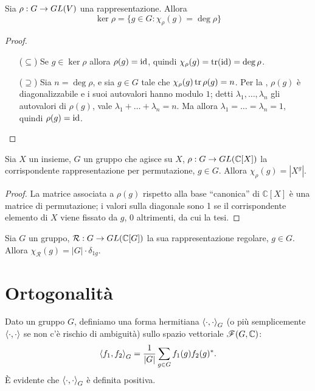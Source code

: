 \begin{proposition}
Sia $\rho:G\to GL(V)$ una rappresentazione. Allora
$$
\ker\rho=\{g\in G:\chi_\rho(g)=\deg\rho\}
$$
\end{proposition}
\begin{proof}
\leavevmode
\begin{itemize}
\item[($\subseteq$)] Se $g\in\ker\rho$ allora $\rho(g)=\operatorname{id}$, quindi $\chi_\rho(g)=\operatorname{tr}(\operatorname{id})=\deg\rho$.
\item[($\supseteq$)] Sia $n=\deg\rho$, e sia $g\in G$ tale che $\chi_\rho(g)\operatorname{tr}\rho(g)=n$. Per la , $\rho(g)$ è diagonalizzabile e i suoi autovalori hanno modulo $1$; detti $\lambda_1,\ldots,\lambda_n$ gli autovalori di $\rho(g)$, vale $\lambda_1+\ldots+\lambda_n=n$. Ma allora $\lambda_1=\ldots=\lambda_n=1$, quindi $\rho(g)=\operatorname{id}$.
\end{itemize}
\end{proof}


\begin{proposition}
Sia $X$ un insieme, $G$ un gruppo che agisce su $X$, $\rho:G\to GL(\mathbb{C}[X])$ la corrispondente rappresentazione per permutazione, $g\in G$. Allora $\chi_\rho(g)=|X^g|$.
\end{proposition}
\begin{proof}
La matrice associata a $\rho(g)$ rispetto alla base ``canonica'' di $\mathbb{C}[X]$ è una matrice di permutazione; i valori sulla diagonale sono 1 se il corrispondente elemento di $X$ viene fissato da $g$, 0 altrimenti, da cui la tesi.
\end{proof}

\begin{corollary}
Sia $G$ un gruppo, $\mathcal{R}:G\to GL(\mathbb{C}[G])$ la sua rappresentazione regolare, $g\in G$. Allora $\chi_\mathcal{R}(g)=|G|\cdot\delta_{1g}$.
\end{corollary}

\section{Ortogonalità}

Dato un gruppo $G$, definiamo una forma hermitiana $\left\langle\cdot,\cdot\right\rangle_G$ (o più semplicemente $\left\langle\cdot,\cdot\right\rangle$ se non c'è rischio di ambiguità) sullo spazio vettoriale $\mathscr{F}(G,\mathbb{C})$:
$$
\left\langle f_1,f_2\right\rangle_G=\frac{1}{|G|}\sum_{g\in G}f_1(g)f_2(g)^*.
$$
È evidente che $\left\langle\cdot,\cdot\right\rangle_G$ è definita positiva.

